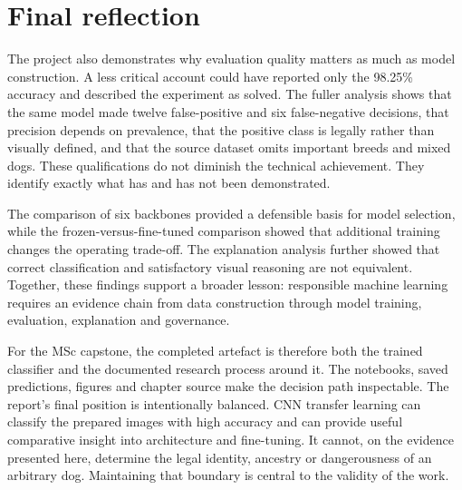 \section{Final reflection}
The project also demonstrates why evaluation quality matters as much as model construction. A less critical account could have reported only the 98.25\% accuracy and described the experiment as solved. The fuller analysis shows that the same model made twelve false-positive and six false-negative decisions, that precision depends on prevalence, that the positive class is legally rather than visually defined, and that the source dataset omits important breeds and mixed dogs. These qualifications do not diminish the technical achievement. They identify exactly what has and has not been demonstrated.

The comparison of six backbones provided a defensible basis for model selection, while the frozen-versus-fine-tuned comparison showed that additional training changes the operating trade-off. The explanation analysis further showed that correct classification and satisfactory visual reasoning are not equivalent. Together, these findings support a broader lesson: responsible machine learning requires an evidence chain from data construction through model training, evaluation, explanation and governance.

For the MSc capstone, the completed artefact is therefore both the trained classifier and the documented research process around it. The notebooks, saved predictions, figures and chapter source make the decision path inspectable. The report's final position is intentionally balanced. CNN transfer learning can classify the prepared images with high accuracy and can provide useful comparative insight into architecture and fine-tuning. It cannot, on the evidence presented here, determine the legal identity, ancestry or dangerousness of an arbitrary dog. Maintaining that boundary is central to the validity of the work.
